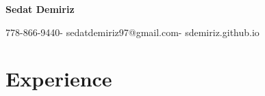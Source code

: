 \documentclass{article}
\makeatletter
\newcommand{\name}{Sedat Demiriz}
\newcommand{\email}{sedatdemiriz97@gmail.com}
\newcommand{\phone}{778-866-9440}
\newcommand{\website}{sdemiriz.github.io}
\makeatother
\begin{document}
\begin{minipage}[t]{1\textwidth} 
  \centering \Huge 
  \textbf{\name} \vspace{.5cm} 
\end{minipage}
\begin{minipage}[t]{1\textwidth} 
  \centering \normalsize 
  \phone \hspace{.1cm}-\hspace{.1cm} \email \hspace{.1cm}-\hspace{.1cm} \website 
\end{minipage}

\section*{Experience} \vspace{-.3cm}
\hrulefill
\end{document}
